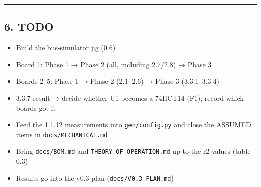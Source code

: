\documentclass[
  10pt,
]{article}
\providecommand{\tightlist}{%
  \setlength{\itemsep}{0pt}\setlength{\parskip}{0pt}}
\renewcommand{\arraystretch}{1.25}
\begin{document}
\begin{center}\rule{0.5\linewidth}{0.5pt}\end{center}

\renewcommand{\arraystretch}{1.25}
\hypertarget{todo}{%
\subsection{6. TODO}\label{todo}}

\begin{itemize}
\tightlist
\item[$\square$]
  Build the bus-simulator jig (0.6)
\item[$\square$]
  Board 1: Phase 1 → Phase 2 (all, including 2.7/2.8) →
  Phase 3
\item[$\square$]
  Boards 2--5: Phase 1 → Phase 2 (2.1--2.6) → Phase 3
  (3.3.1--3.3.4)
\item[$\square$]
  \textcolor[HTML]{0040A0}{3.3.7 result → decide whether U1
  becomes a 74HCT14 (F1); record which boards got it}
\item[$\square$]
  Feed the 1.1.12 measurements into \texttt{gen/config.py}
  and close the ASSUMED items in \texttt{docs/MECHANICAL.md}
\item[$\square$]
  Bring \texttt{docs/BOM.md} and
  \texttt{THEORY\_OF\_OPERATION.md} up to the r2 values
  (table 0.3)
\item[$\square$]
  Results go into the v0.3 plan
  (\texttt{docs/V0.3\_PLAN.md})
\end{itemize}
\end{document}
